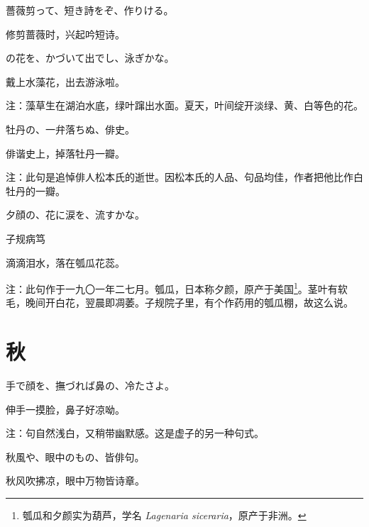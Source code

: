 \begin{haiku}
    {\FH 薔薇剪って、短き詩をぞ、作りける。}

    {\FK 修剪蔷薇时，兴起吟短诗。}
\end{haiku}

\begin{haiku}
    {\FH {}の花を、かづいて出でし、泳ぎかな。}

    {\FK 戴上水藻花，出去游泳啦。}

    {\FT 注：藻草生在湖泊水底，绿叶蹿出水面。夏天，叶间绽开淡绿、黄、白等色的花。}
\end{haiku}

\begin{haiku}
    {\FH 牡丹の、一弁落ちぬ、俳史。}

    {\FK 俳谐史上，掉落牡丹一瓣。}

    {\FT 注：此句是追悼俳人松本氏的逝世。因松本氏的人品、句品均佳，作者把他比作白牡丹的一瓣。}
\end{haiku}

\begin{haiku}
    {\FH 夕顔の、花に涙を、流すかな。}

    {\FK 子规病笃}

    {\FK 滴滴泪水，落在瓠瓜花蕊。}

    {\FT 注：此句作于一九〇一年二七月。瓠瓜，日本称夕颜，原产于美国\footnote{{\FT 瓠瓜和夕颜实为葫芦，学名} \textit{Lagenaria siceraria}{\FT，原产于非洲。}}。茎叶有软毛，晚间开白花，翌晨即凋萎。子规院子里，有个作药用的瓠瓜棚，故这么说。}
\end{haiku}

\section{\FK 秋}

\setcounter{haikucounter}{0}

\begin{haiku}
    {\FH 手で顔を、撫づれば鼻の、冷たさよ。}

    {\FK 伸手一摸脸，鼻子好凉呦。}

    {\FT 注：句自然浅白，又稍带幽默感。这是虚子的另一种句式。}
\end{haiku}

\begin{haiku}
    {\FH 秋風や、眼中のもの、皆俳句。}

    {\FK 秋风吹拂凉，眼中万物皆诗章。}
\end{haiku}


